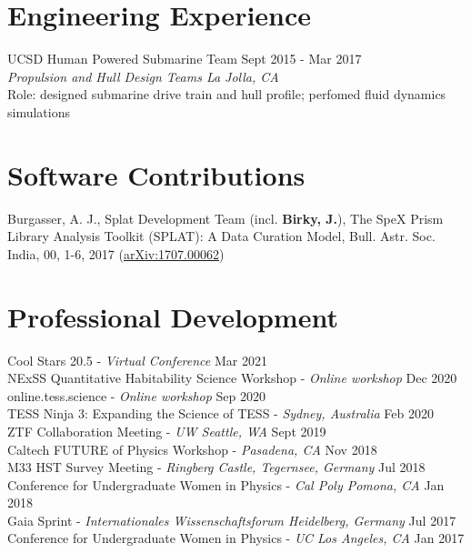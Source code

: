 \documentclass[margin,line]{resume}
\begin{document}
\begin{resume}
\section{\mysidestyle \textcolor{bcolor}{Engineering Experience}}
UCSD Human Powered Submarine Team \hfill Sept 2015 - Mar 2017 \\
\textsl{Propulsion and Hull Design Teams \hfill La Jolla, CA}  \\
Role: designed submarine drive train and hull profile; perfomed fluid dynamics simulations


\section{\mysidestyle \textcolor{bcolor}{Software Contributions}}
Burgasser, A. J., Splat Development Team (incl. \textbf{Birky, J.}), The SpeX Prism Library Analysis Toolkit (SPLAT): A Data Curation Model, Bull. Astr. Soc. India, 00, 1-6, 2017 (\href{https://arxiv.org/abs/1707.00062}{arXiv:1707.00062})


\section{\mysidestyle \textcolor{bcolor}{Professional Development}}
Cool Stars 20.5 - \textit{Virtual Conference} \hfill Mar 2021 \\
NExSS Quantitative Habitability Science Workshop - \textit{Online workshop} \hfill Dec 2020 \\
online.tess.science - \textit{Online workshop} \hfill Sep 2020 \\
TESS Ninja 3: Expanding the Science of TESS - \textit{Sydney, Australia} \hfill Feb 2020 \\
ZTF Collaboration Meeting - \textit{UW Seattle, WA} \hfill Sept 2019 \\
Caltech FUTURE of Physics Workshop - \textit{Pasadena, CA} \hfill Nov 2018 \\
M33 HST Survey Meeting - \textit{Ringberg Castle, Tegernsee, Germany} \hfill Jul 2018 \\
Conference for Undergraduate Women in Physics - \textit{Cal Poly Pomona, CA}  \hfill Jan 2018 \\
Gaia Sprint - \textit{Internationales Wissenschaftsforum Heidelberg, Germany}  \hfill Jul 2017 \\
{Conference for Undergraduate Women in Physics} - \textit{UC Los Angeles, CA}  \hfill Jan 2017 


\end{resume}
\end{document}
